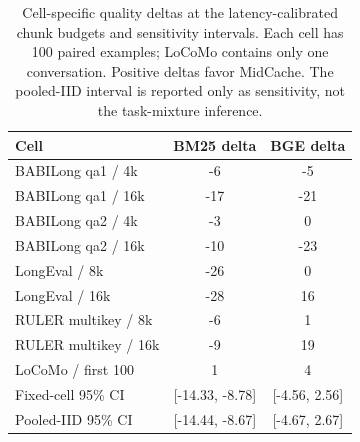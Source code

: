 \begin{table}[htbp]
\centering
\small
\setlength{\tabcolsep}{4pt}
\begin{tabular}{@{}lcc@{}}
\toprule
Cell & BM25 delta & BGE delta \\
\midrule
BABILong qa1 / 4k & -6 & -5 \\
BABILong qa1 / 16k & -17 & -21 \\
BABILong qa2 / 4k & -3 & 0 \\
BABILong qa2 / 16k & -10 & -23 \\
LongEval / 8k & -26 & 0 \\
LongEval / 16k & -28 & 16 \\
RULER multikey / 8k & -6 & 1 \\
RULER multikey / 16k & -9 & 19 \\
LoCoMo / first 100 & 1 & 4 \\
\midrule
Fixed-cell 95\% CI & [-14.33, -8.78] & [-4.56, 2.56] \\
Pooled-IID 95\% CI & [-14.44, -8.67] & [-4.67, 2.67] \\
\bottomrule
\end{tabular}
\caption{Cell-specific quality deltas at the latency-calibrated chunk budgets and sensitivity intervals. Each cell has 100 paired examples; LoCoMo contains only one conversation. Positive deltas favor MidCache. The pooled-IID interval is reported only as sensitivity, not the task-mixture inference.}
\label{tab:equal-cells}
\end{table}
